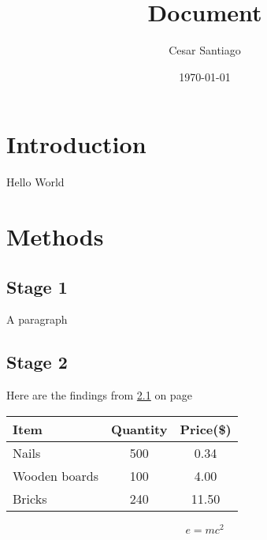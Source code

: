 \documentclass[a4paper,12pt]{article}
\begin{document}
\title{Document}
\author{Cesar Santiago}
\date{\today}
\maketitle

\tableofcontents
\newpage
{}

\section{Introduction}
Hello World

\section{Methods}

\subsection{Stage 1}
\label{sec1}
A paragraph

\subsection{Stage 2}
Here are the findings from \ref{sec1} on page \pageref{sec1} \\

\begin{tabular}{l|c|c}
Item & Quantity & Price(\$) \\
\hline
Nails & 500 & 0.34 \\
Wooden boards & 100 & 4.00 \\
Bricks & 240 & 11.50 \\
\end{tabular}

\vspace{20px}

\begin{equation}
e = mc^2
\end{equation}
\end{document}
